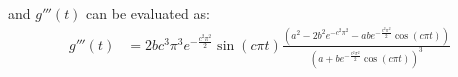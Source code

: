 \documentclass[letterpaper]{article}
\begin{document}
and $g'''(t)$ can be evaluated as:
\begin{align*}
g'''(t)&= 2bc^{3}\pi^{3} e^{-\frac{c^{2}\pi^{2}}{2}}\sin(c\pi t)\frac{\left(a^{2} - 2b^{2} e^{-c^{2}\pi^{2}} - ab e^{-\frac{c^{2}\pi^{2}}{2}}\cos(c\pi t)\right) }{(a + be^{-\frac{c^{2}\pi^{2}}{2}}\cos(c\pi t))^{3}}
\end{align*}
\end{document}
